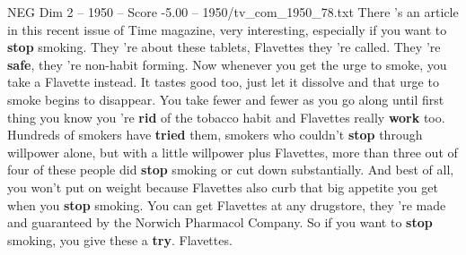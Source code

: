 \begin{textsample}{NEG Dim 2 – 1950 – Score -5.00 – 1950/tv\_com\_1950\_78.txt}  \label{ex:f2_neg_081}
There 's an article in this recent issue of Time magazine, very interesting, especially if you want to \textbf{stop} smoking.
They 're about these tablets, Flavettes they 're called.
They 're \textbf{safe}, they 're non-habit forming.
Now whenever you get the urge to smoke, you take a Flavette instead.
It tastes good too, just let it dissolve and that urge to smoke begins to disappear.
You take fewer and fewer as you go along until first thing you know you 're \textbf{rid} of the tobacco habit and Flavettes really \textbf{work} too.
Hundreds of smokers have \textbf{tried} them, smokers who couldn't \textbf{stop} through willpower alone, but with a little willpower plus Flavettes, more than three out of four of these people did \textbf{stop} smoking or cut down substantially.
And best of all, you won't put on weight because Flavettes also curb that big appetite you get when you \textbf{stop} smoking.
You can get Flavettes at any drugstore, they 're made and guaranteed by the Norwich Pharmacol Company.
So if you want to \textbf{stop} smoking, you give these a \textbf{try}.
Flavettes.

\end{textsample}
